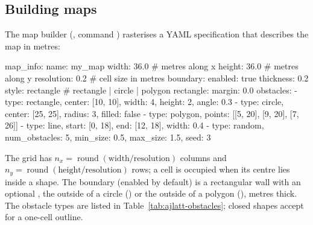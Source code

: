 \subsection{Building maps}\label{sec:ajlatt-builder}

The map builder (, command
) rasterises a YAML specification that describes the map
in metres:

\begin{textcode}
map_info:
  name: my_map
  width: 36.0            # metres along x
  height: 36.0           # metres along y
  resolution: 0.2        # cell size in metres
  boundary:
    enabled: true
    thickness: 0.2
    style: rectangle     # rectangle | circle | polygon
    rectangle: {margin: 0.0}
obstacles:
  - {type: rectangle, center: [10, 10], width: 4, height: 2, angle: 0.3}
  - {type: circle, center: [25, 25], radius: 3, filled: false}
  - {type: polygon, points: [[5, 20], [9, 20], [7, 26]]}
  - {type: line, start: [0, 18], end: [12, 18], width: 0.4}
  - {type: random, num_obstacles: 5, min_size: 0.5, max_size: 1.5, seed: 3}
\end{textcode}

The grid has $n_x = \operatorname{round}(\text{width}/\text{resolution})$ columns
and $n_y = \operatorname{round}(\text{height}/\text{resolution})$ rows; a cell
is occupied when its centre lies inside a shape. The boundary (enabled by
default) is a rectangular wall with an optional , the outside of a
circle () or the outside of a polygon
(),  metres thick. The obstacle types
are listed in Table~\ref{tab:ajlatt-obstacles}; closed shapes accept
 for a one-cell outline.

